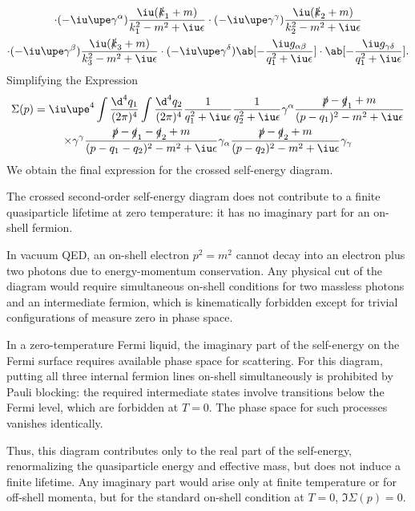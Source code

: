\begin{solution}
\begin{multline*}
    \cdot
    (-\iu\upe\gamma^\alpha)
    \frac{\iu(\slashed k_1 + m)}{k_1^2 - m^2 + \iu\epsilon}
    \cdot
    (-\iu\upe\gamma^\gamma)
    \frac{\iu(\slashed k_2 + m)}{k_2^2 - m^2 + \iu\epsilon}\\
    \cdot
    (-\iu\upe\gamma^\beta)
    \frac{\iu(\slashed k_3 + m)}{k_3^2 - m^2 + \iu\epsilon}
    \cdot
    (-\iu\upe\gamma^\delta)
    \ab[-\frac{\iu g_{\alpha\beta}}{q_1^2 + \iu\epsilon}]
    \cdot
    \ab[-\frac{\iu g_{\gamma\delta}}{q_1^2 + \iu\epsilon}].
  \end{multline*}
  Simplifying the Expression
  \begin{multline*}
    \Sigma(p) = \iu \upe^4
    \int \frac{\d^4q_1}{(2\pi)^4} \int \frac{\d^4q_2}{(2\pi)^4}
    \frac{1}{q_1^2 + \iu\epsilon} \frac{1}{q_2^2 + \iu\epsilon}
    \gamma^\alpha
    \frac{\slashed p - \slashed q_1 + m}{(p - q_1)^2 - m^2 + \iu\epsilon}\\
    \times \gamma^\gamma
    \frac{\slashed p - \slashed q_1 - \slashed q_2 + m}
      {(p - q_1 - q_2)^2 - m^2 + \iu\epsilon}
    \gamma_\alpha
    \frac{\slashed p - \slashed q_2 + m}
      {(p - q_2)^2 - m^2 + \iu\epsilon}
    \gamma_\gamma
  \end{multline*}
  We obtain the final expression for the crossed self-energy diagram.

  The crossed second-order self-energy diagram does not contribute to a finite
  quasiparticle lifetime at zero temperature: it has no imaginary part for an
  on-shell fermion.
  \begin{enumext}
    \item In vacuum QED, an on-shell electron $p^2 = m^2$ cannot decay into an
    electron plus two photons due to energy-momentum conservation. Any physical
    cut of the diagram would require simultaneous on-shell conditions for two
    massless photons and an intermediate fermion, which is kinematically
    forbidden except for trivial configurations of measure zero in phase space.
    \item In a zero-temperature Fermi liquid, the imaginary part of the
    self-energy on the Fermi surface requires available phase space for
    scattering. For this diagram, putting all three internal fermion lines
    on-shell simultaneously is prohibited by Pauli blocking: the required
    intermediate states involve transitions below the Fermi level, which are
    forbidden at $T=0$. The phase space for such processes vanishes identically.
  \end{enumext}
  Thus, this diagram contributes only to the real part of the self-energy,
  renormalizing the quasiparticle energy and effective mass, but does not induce
  a finite lifetime. Any imaginary part would arise only at finite temperature
  or for off-shell momenta, but for the standard on-shell condition at $T = 0$,
  $\Im \Sigma(p) = 0$.
\end{solution}

